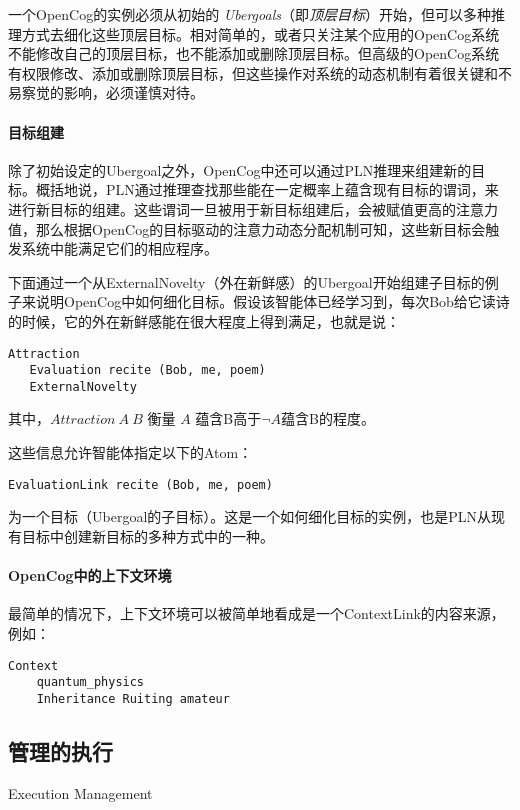 一个OpenCog的实例必须从初始的 \textit{Ubergoals}（即\textit{顶层目标}）开始，但可以多种推理方式去细化这些顶层目标。相对简单的，或者只关注某个应用的OpenCog系统不能修改自己的顶层目标，也不能添加或删除顶层目标。但高级的OpenCog系统有权限修改、添加或删除顶层目标，但这些操作对系统的动态机制有着很关键和不易察觉的影响，必须谨慎对待。

\paragraph{目标组建}\label{Goal Formation}

除了初始设定的Ubergoal之外，OpenCog中还可以通过PLN推理来组建新的目标。概括地说，PLN通过推理查找那些能在一定概率上蕴含现有目标的谓词，来进行新目标的组建。这些谓词一旦被用于新目标组建后，会被赋值更高的注意力值，那么根据OpenCog的目标驱动的注意力动态分配机制可知，这些新目标会触发系统中能满足它们的相应程序。

下面通过一个从ExternalNovelty（外在新鲜感）的Ubergoal开始组建子目标的例子来说明OpenCog中如何细化目标。假设该智能体已经学习到，每次Bob给它读诗的时候，它的外在新鲜感能在很大程度上得到满足，也就是说：

\begin{verbatim}
Attraction
   Evaluation recite (Bob, me, poem)
   ExternalNovelty
\end{verbatim}
\noindent 其中，$\textit{Attraction}\ A\ B$ 衡量 $A$ 蕴含B高于$\lnot A$蕴含B的程度。

这些信息允许智能体指定以下的Atom：

\begin{verbatim}
EvaluationLink recite (Bob, me, poem)
\end{verbatim}

\noindent 为一个目标（Ubergoal的子目标）。这是一个如何细化目标的实例，也是PLN从现有目标中创建新目标的多种方式中的一种。

\paragraph{OpenCog中的上下文环境}\label{Context Atoms}

最简单的情况下，上下文环境可以被简单地看成是一个ContextLink的内容来源，例如：

\begin{verbatim}
Context
    quantum_physics
    Inheritance Ruiting amateur
\end{verbatim}

\subsection{管理的执行}{Execution Management}
\label{Execution Management}

